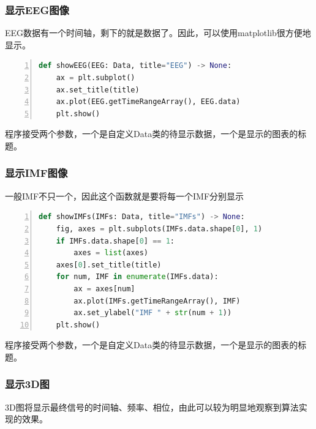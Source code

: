 \documentclass[cs4size,a4paper]{ctexart}
\numberwithin{equation}{section}
\numberwithin{table}{section}
\numberwithin{figure}{section}
\begin{document}
\subsubsection{显示EEG图像}

EEG数据有一个时间轴，剩下的就是数据了。因此，可以使用matplotlib很方便地显示。

\begin{lstlisting}[language={python},
numbers=left,
numberstyle=\tiny\monaco,
basicstyle=\footnotesize\monaco]
def showEEG(EEG: Data, title="EEG") -> None:
    ax = plt.subplot()
    ax.set_title(title)
    ax.plot(EEG.getTimeRangeArray(), EEG.data)
    plt.show()
\end{lstlisting}

程序接受两个参数，一个是自定义Data类的待显示数据，一个是显示的图表的标题。

\subsubsection{显示IMF图像}

一般IMF不只一个，因此这个函数就是要将每一个IMF分别显示

\begin{lstlisting}[language={python},
numbers=left,
numberstyle=\tiny\monaco,
basicstyle=\footnotesize\monaco]
def showIMFs(IMFs: Data, title="IMFs") -> None:
    fig, axes = plt.subplots(IMFs.data.shape[0], 1)
    if IMFs.data.shape[0] == 1:
        axes = list(axes)
    axes[0].set_title(title)
    for num, IMF in enumerate(IMFs.data):
        ax = axes[num]        
        ax.plot(IMFs.getTimeRangeArray(), IMF)
        ax.set_ylabel("IMF " + str(num + 1))
    plt.show()
\end{lstlisting}

程序接受两个参数，一个是自定义Data类的待显示数据，一个是显示的图表的标题。

\subsubsection{显示3D图}

3D图将显示最终信号的时间轴、频率、相位，由此可以较为明显地观察到算法实现的效果。
\end{document}
